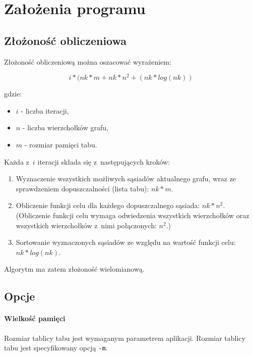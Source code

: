 \section{Założenia programu}

\subsection{Złożoność obliczeniowa}

Złożoność obliczeniową można oszacować wyrażeniem:

\begin{equation}
	i * (nk * m + nk * n^2 + (nk * log(nk))
\end{equation}

\noindent gdzie:

\begin{itemize}
 \item $i$ - liczba iteracji,
 \item $n$ - liczba wierzchołków grafu,
 \item $m$ - rozmiar pamięci tabu.
\end{itemize}

\noindent Każda z~$i$ iteracji składa się z~następujących kroków:

\begin{enumerate}
 \item Wyznaczenie wszystkich możliwych sąsiadów aktualnego grafu, wraz ze sprawdzeniem dopuszczalności (lista tabu): $nk * m$.
 \item Obliczenie funkcji celu dla każdego dopuszczalnego sąsiada: $nk * n^2$. (Obliczenie funkcji celu wymaga odwiedzenia wszystkich wierzchołków oraz wszystkich wierzchołków z~nimi połączonych: $n^2$.)
 \item Sortowanie wyznaczonych sąsiadów ze względu na wartość funkcji celu: $nk * log(nk)$.
\end{enumerate}

\noindent Algorytm ma zatem złożoność wielomianową. 

\subsection{Opcje}

\paragraph{Wielkość pamięci}

Rozmiar tablicy tabu jest wymaganym parametrem aplikacji. Rozmiar tablicy tabu jest specyfikowany opcją \verb+-m+. 

